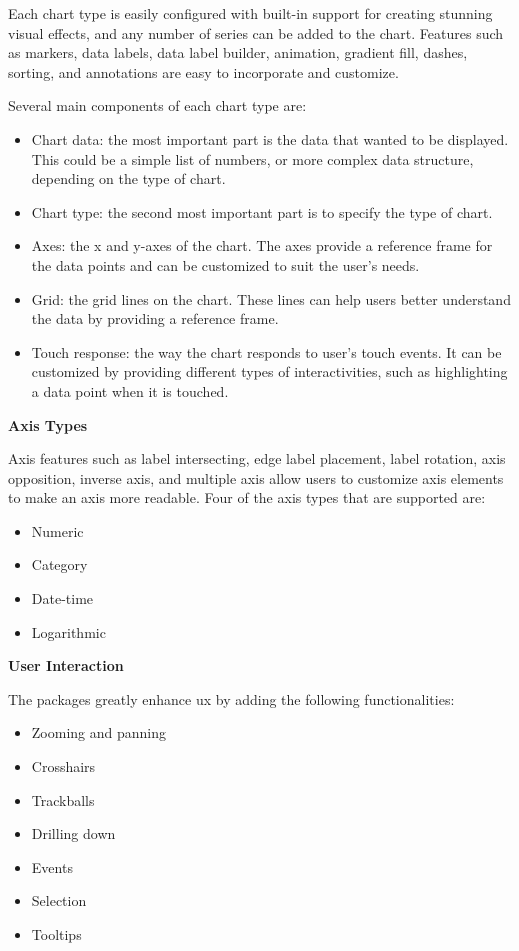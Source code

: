 \begin{multicols}{2}
      Each chart type is easily configured with built-in support for creating stunning visual effects, and any
      number of series can be added to the chart. Features such as markers, data labels, data label builder,
      animation, gradient fill, dashes, sorting, and annotations are easy to incorporate and customize.

      Several main components of each chart type are:
      \begin{itemize}
            \item Chart data: the most important part is the data that wanted to be displayed. This could be a simple
                  list of numbers, or more complex data structure, depending on the type of chart.
            \item Chart type: the second most important part is to specify the type of chart.
            \item Axes: the x and y-axes of the chart. The axes provide a reference frame for the data points and
                  can be customized to suit the user's needs.
            \item Grid: the grid lines on the chart. These lines can help users better understand the data by
                  providing a reference frame.
            \item Touch response: the way the chart responds to user's touch events. It can be customized by
                  providing different types of interactivities, such as highlighting a data point when it is touched.
      \end{itemize}

      \textbf{Axis Types}

      Axis features such as label intersecting, edge label placement, label rotation, axis opposition, inverse
      axis, and multiple axis allow users to customize axis elements to make an axis more readable. Four of the
      axis types that are supported are:
      \begin{itemize}
            \item Numeric
            \item Category
            \item Date-time
            \item Logarithmic
      \end{itemize}

      \textbf{User Interaction}

      The packages greatly enhance \acrshort{ux} by adding the following functionalities:
      \begin{itemize}
            \item Zooming and panning
            \item Crosshairs
            \item Trackballs
            \item Drilling down
            \item Events
            \item Selection
            \item Tooltips
      \end{itemize}


\end{multicols}
